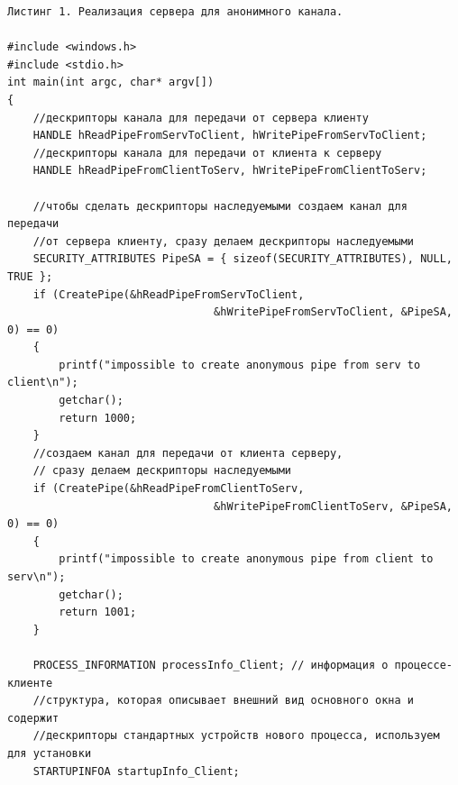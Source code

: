\documentclass[a4paper,12pt]{article} %
\begin{document}
\begin{verbatim}
Листинг 1. Реализация сервера для анонимного канала.

#include <windows.h>
#include <stdio.h>
int main(int argc, char* argv[])
{
    //дескрипторы канала для передачи от сервера клиенту
    HANDLE hReadPipeFromServToClient, hWritePipeFromServToClient;
    //дескрипторы канала для передачи от клиента к серверу
    HANDLE hReadPipeFromClientToServ, hWritePipeFromClientToServ;

    //чтобы сделать дескрипторы наследуемыми создаем канал для передачи
    //от сервера клиенту, сразу делаем дескрипторы наследуемыми
    SECURITY_ATTRIBUTES PipeSA = { sizeof(SECURITY_ATTRIBUTES), NULL, TRUE };
    if (CreatePipe(&hReadPipeFromServToClient,
                                &hWritePipeFromServToClient, &PipeSA, 0) == 0)
    {
        printf("impossible to create anonymous pipe from serv to client\n");
        getchar();
        return 1000;
    }
    //создаем канал для передачи от клиента серверу,
    // сразу делаем дескрипторы наследуемыми
    if (CreatePipe(&hReadPipeFromClientToServ,
                                &hWritePipeFromClientToServ, &PipeSA, 0) == 0)
    {
        printf("impossible to create anonymous pipe from client to serv\n");
        getchar();
        return 1001;
    }

    PROCESS_INFORMATION processInfo_Client; // информация о процессе-клиенте
    //структура, которая описывает внешний вид основного окна и содержит
    //дескрипторы стандартных устройств нового процесса, используем для установки
    STARTUPINFOA startupInfo_Client;
    

\end{verbatim}
\end{document}
